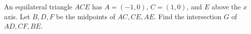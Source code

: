 An equilateral triangle $ACE$ has $A=(-1,0)$, $C=(1,0)$, and $E$ above the $x$ axis. Let $B,D,F$ be the midpoints of $AC,CE,AE$. Find the intersection $G$ of $AD,CF,BE$.
